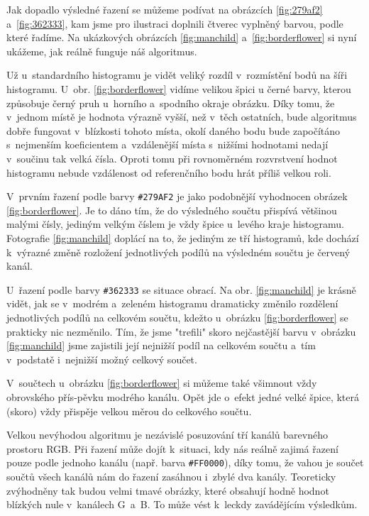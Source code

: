 \documentclass[12pt,oneside,a4paper]{article}
\begin{document}
Jak dopadlo výsledné řazení se můžeme podívat na obrázcích \ref{fig:279af2} a~\ref{fig:362333}, kam jsme pro ilustraci doplnili čtverec vyplněný barvou, podle které řadíme. Na ukázkových obrázcích \ref{fig:manchild} a~\ref{fig:borderflower} si nyní ukážeme, jak reálně funguje náš algoritmus.

Už u~standardního histogramu je vidět veliký rozdíl v~rozmístění bodů na šíři histogramu. U~obr. \ref{fig:borderflower} vidíme velikou špici u černé barvy, kterou způsobuje černý pruh u~horního a~spodního okraje obrázku. Díky tomu, že v~jednom místě je hodnota výrazně vyšší, než v~těch ostatních, bude algoritmus dobře fungovat v~blízkosti tohoto místa, okolí daného bodu bude započítáno s~nejmenším koeficientem a~vzdálenější místa s~nižšími hodnotami nedají v~součinu tak velká čísla. Oproti tomu při rovnoměrném rozvrstvení hodnot histogramu nebude vzdálenost od referenčního bodu hrát příliš velkou roli.

V~prvním řazení podle barvy \verb|#279AF2| je jako podobnější vyhodnocen obrázek \ref{fig:borderflower}. Je to dáno tím, že do výsledného součtu přispívá většinou malými čísly, jediným velkým číslem je vždy špice u~levého kraje histogramu. Fotografie \ref{fig:manchild} doplácí na to, že jediným ze tří histogramů, kde dochází k~výrazné změně rozložení jednotlivých podílů na výsledném součtu je červený kanál.

U~řazení podle barvy \verb|#362333| se situace obrací. Na obr. \ref{fig:manchild} je krásně vidět, jak se v~modrém a~zeleném histogramu dramaticky změnilo rozdělení jednotlivých podílů na celkovém součtu, kdežto u~obrázku \ref{fig:borderflower} se prakticky nic nezměnilo. Tím, že jsme "trefili" skoro nejčastější barvu v~obrázku \ref{fig:manchild} jsme zajistili její nejnižší podíl na celkovém součtu a~tím v~podstatě i~nejnižší možný celkový součet.

V~součtech u~obrázku \ref{fig:borderflower} si můžeme také všimnout vždy obrovského přís-pěvku modrého kanálu. Opět jde o~efekt jedné velké špice, která (skoro) vždy přispěje velkou měrou do celkového součtu.

Velkou nevýhodou algoritmu je nezávislé posuzování tří kanálů barevného prostoru RGB. Při řazení může dojít k~situaci, kdy nás reálně zajimá řazení pouze podle jednoho kanálu (např. barva \verb|#FF0000|), díky tomu, že vahou je součet součtů všech kanálů nám do řazení zasáhnou i~zbylé dva kanály. Teoreticky zvýhodněny tak budou velmi tmavé obrázky, které obsahují hodně hodnot blízkých nule v~kanálech G~a~B. To může vést k~leckdy zavádějícím výsledkům.
\end{document}
